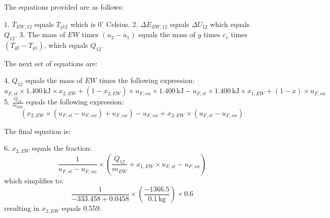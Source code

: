 The equations provided are as follows:

1. \( T_{EW,12} \) equals \( T_{g12} \) which is \( 0^\circ \) Celsius.
2. \( \Delta E_{EW,12} \) equals \( \Delta U_{12} \) which equals \( Q_{12} \).
3. The mass of \( EW \) times \( (u_2 - u_1) \) equals the mass of \( g \) times \( c_v \) times \( (T_{g2} - T_{g1}) \), which equals \( Q_{12} \).

The next set of equations are:

4. \( Q_{12} \) equals the mass of \( EW \) times the following expression:
   \[
   u_{F,st} \times 1.400 \, \text{kJ} \times x_{2,EW} + (1 - x_{2,EW}) \times u_{F,sw} \times 1.400 \, \text{kJ} - u_{F,st} \times 1.400 \, \text{kJ} \times x_{1,EW} + (1 - x) \times u_{F,sw}
   \]
5. \( \frac{Q_{12}}{m_{EW}} \) equals the following expression:
   \[
   \left( x_{2,EW} \times (u_{F,st} - u_{F,sw}) + u_{F,sw} \right) - u_{F,sw} + x_{2,EW} \times (u_{F,st} - u_{F,sw})
   \]

The final equation is:

6. \( x_{2,EW} \) equals the fraction:
   \[
   \frac{1}{u_{F,st} - u_{F,sw}} \times \left( \frac{Q_{12}}{m_{EW}} + x_{1,EW} \times u_{F,st} - u_{F,sw} \right)
   \]
   which simplifies to:
   \[
   \frac{1}{-333.458 + 0.0458} \times \left( \frac{-1366.5}{0.1 \, \text{kg}} \right) \times 0.6
   \]
   resulting in \( x_{2,EW} \) equals 0.559.